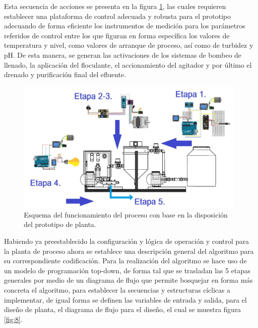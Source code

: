 \documentclass[conference]{IEEEtran}
\begin{document}
	Esta secuencia de acciones se presenta en la figura \ref{fig:7}, las cuales requieren establecer una plataforma de control adecuada y robusta para el prototipo adecuando de forma eficiente los instrumentos de medición para los parámetros referidos de control entre los que figuran en forma específica los valores de temperatura y nivel, como valores de arranque de proceso, así como de turbidez y pH. De esta manera, se generan las activaciones de los sistemas de bombeo de llenado, la aplicación del floculante, el accionamiento del agitador y por último el drenado y purificación final del efluente.
	
	\begin{figure}[htbp]
		\centering
		\includegraphics[width=\columnwidth]{fig7.jpg}
		\caption{Esquema del funcionamiento del proceso con base en la disposición del prototipo de planta.}
		\label{fig:7}
	\end{figure}
	
	Habiendo ya preestablecido la configuración y lógica de operación y control para la planta de proceso ahora se establece una descripción general del algoritmo para su correspondiente codificación. Para la realización del algoritmo se hace uso de un modelo de programación top-down, de forma tal que se trasladan las 5 etapas generales por medio de un diagrama de flujo que permite bosquejar en forma más concreta el algoritmo, para establecer la secuencias y estructuras cíclicas a implementar, de igual forma se definen las variables de entrada y salida, para el diseño de planta, el diagrama de flujo para el diseño, el cual se muestra figura \ref{fig:8}.
	
\end{document}
